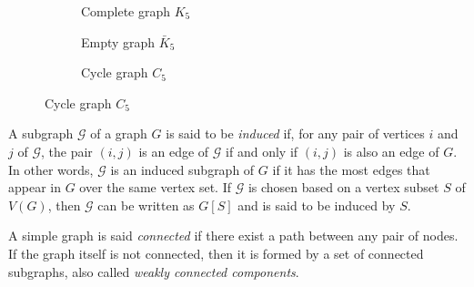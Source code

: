 \begin{figure}[htb]
\centering
	\begin{subfigure}[t]{0.3\textwidth}\centering
	\caption{{\footnotesize Complete graph $K_5$}}\label{fig:completegraph}
	\end{subfigure}
	\begin{subfigure}[t]{0.3\textwidth}\centering
	\caption{{\footnotesize Empty graph $\bar{K}_5$}}\label{fig:emptygraph}
	\end{subfigure}
	\begin{subfigure}[t]{0.3\textwidth}\centering
	\caption{{\footnotesize Cycle graph $C_5$}}\label{fig:cyclegraph}
	\end{subfigure}
\end{figure}

A subgraph $\mathcal{G}$ of a graph $G$ is said to be \emph{induced} if, for any pair of vertices $i$ and $j$ of $\mathcal{G}$, the pair $(i,j)$ is an edge of $\mathcal{G}$ if and only if $(i,j)$ is also an edge of $G$. In other words, $\mathcal{G}$ is an induced subgraph of $G$ if it has the most edges that appear in $G$ over the same vertex set. If $\mathcal{G}$ is chosen based on a vertex subset $S$ of $V(G)$, then $\mathcal{G}$ can be written as $G[S]$ and is said to be induced by $S$.

A simple graph is said \emph{connected} if there exist a path between any pair of nodes. If the graph itself is not connected, then it is formed by a set of connected subgraphs, also called \emph{weakly connected components}.

